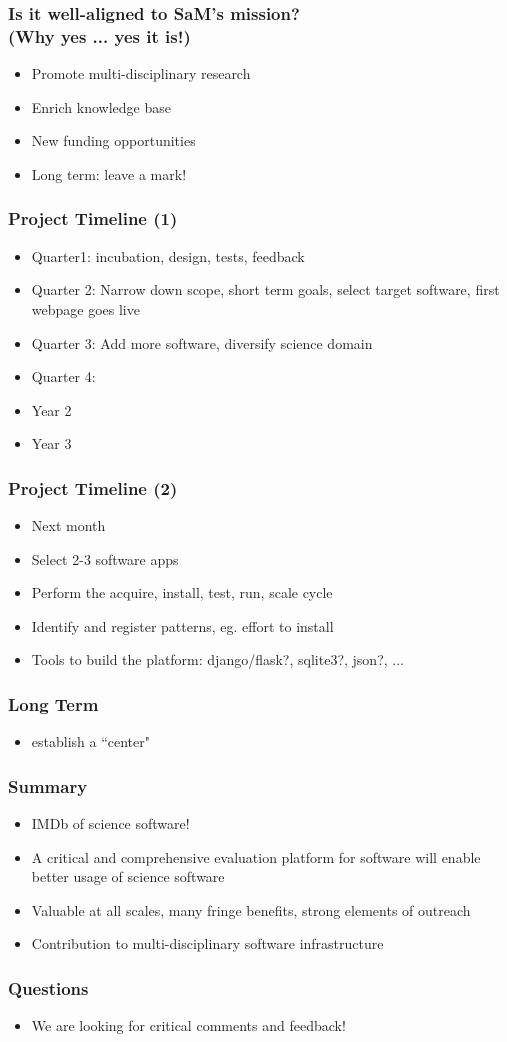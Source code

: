 \documentclass[hyperref={pdfpagelabels=false},12pt]{beamer}
\begin{document}
\begin{frame}
\frametitle{Is it well-aligned to SaM's mission? \\ (Why yes ... yes it is!)}
\begin{itemize}
\itemsep1em
\item 
Promote multi-disciplinary research
\item
Enrich knowledge base
\item
New funding opportunities
\item
Long term: leave a mark!
\end{itemize}
\end{frame}

\begin{frame}
\frametitle{Project Timeline (1)}
\begin{itemize}
\itemsep1em
\item 
Quarter1: incubation, design, tests, feedback
\item
Quarter 2: Narrow down scope, short term goals, select target software, first webpage goes live
\item
Quarter 3: Add more software, diversify science domain
\item
Quarter 4:
\item
Year 2
\item
Year 3
\end{itemize}
\end{frame}

\begin{frame}
\frametitle{Project Timeline (2)}
\begin{itemize}
\itemsep1em
\item 
Next month
\item
Select 2-3 software apps
\item
Perform the acquire, install, test, run, scale cycle
\item
Identify and register patterns, eg. effort to install
\item
Tools to build the platform: django/flask?, sqlite3?, json?, ...
\end{itemize}
\end{frame}

\begin{frame}
\frametitle{Long Term}
\begin{itemize}
\item 
establish a ``center"
\end{itemize}
\end{frame}

\begin{frame}
\frametitle{Summary}
\begin{itemize}
\itemsep1em
\item IMDb of science software!
\item
A critical and comprehensive evaluation platform for software will enable better usage of science software
\item
Valuable at all scales, many fringe benefits, strong elements of outreach
\item
Contribution to multi-disciplinary software infrastructure
\end{itemize}
\end{frame}

\begin{frame}
\frametitle{Questions}
\begin{itemize}
\item We are looking for critical comments and feedback!
\end{itemize}
\end{frame}
\end{document}
